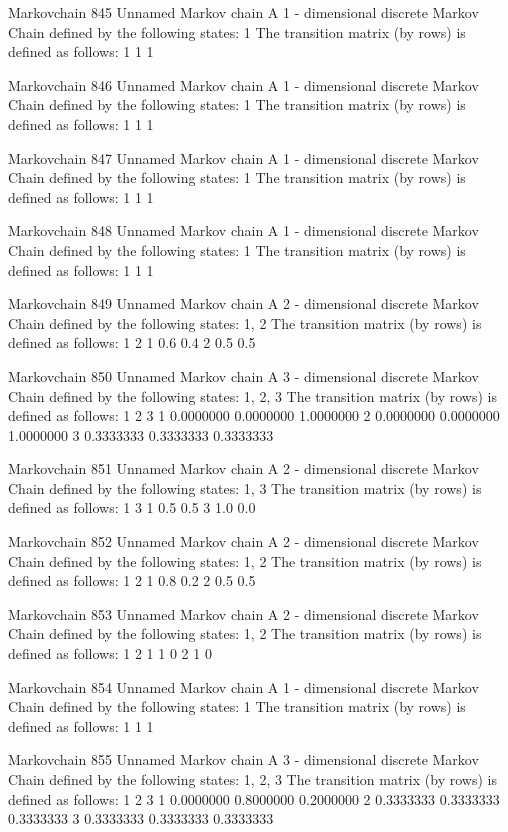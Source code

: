 \documentclass[
  nojss]{jss}
\begin{document}
\begin{CodeChunk}
\begin{CodeOutput}
Markovchain  845 
Unnamed Markov chain 
 A  1 - dimensional discrete Markov Chain defined by the following states: 
 1 
 The transition matrix  (by rows)  is defined as follows: 
  1
1 1

Markovchain  846 
Unnamed Markov chain 
 A  1 - dimensional discrete Markov Chain defined by the following states: 
 1 
 The transition matrix  (by rows)  is defined as follows: 
  1
1 1

Markovchain  847 
Unnamed Markov chain 
 A  1 - dimensional discrete Markov Chain defined by the following states: 
 1 
 The transition matrix  (by rows)  is defined as follows: 
  1
1 1

Markovchain  848 
Unnamed Markov chain 
 A  1 - dimensional discrete Markov Chain defined by the following states: 
 1 
 The transition matrix  (by rows)  is defined as follows: 
  1
1 1

Markovchain  849 
Unnamed Markov chain 
 A  2 - dimensional discrete Markov Chain defined by the following states: 
 1, 2 
 The transition matrix  (by rows)  is defined as follows: 
    1   2
1 0.6 0.4
2 0.5 0.5

Markovchain  850 
Unnamed Markov chain 
 A  3 - dimensional discrete Markov Chain defined by the following states: 
 1, 2, 3 
 The transition matrix  (by rows)  is defined as follows: 
          1         2         3
1 0.0000000 0.0000000 1.0000000
2 0.0000000 0.0000000 1.0000000
3 0.3333333 0.3333333 0.3333333

Markovchain  851 
Unnamed Markov chain 
 A  2 - dimensional discrete Markov Chain defined by the following states: 
 1, 3 
 The transition matrix  (by rows)  is defined as follows: 
    1   3
1 0.5 0.5
3 1.0 0.0

Markovchain  852 
Unnamed Markov chain 
 A  2 - dimensional discrete Markov Chain defined by the following states: 
 1, 2 
 The transition matrix  (by rows)  is defined as follows: 
    1   2
1 0.8 0.2
2 0.5 0.5

Markovchain  853 
Unnamed Markov chain 
 A  2 - dimensional discrete Markov Chain defined by the following states: 
 1, 2 
 The transition matrix  (by rows)  is defined as follows: 
  1 2
1 1 0
2 1 0

Markovchain  854 
Unnamed Markov chain 
 A  1 - dimensional discrete Markov Chain defined by the following states: 
 1 
 The transition matrix  (by rows)  is defined as follows: 
  1
1 1

Markovchain  855 
Unnamed Markov chain 
 A  3 - dimensional discrete Markov Chain defined by the following states: 
 1, 2, 3 
 The transition matrix  (by rows)  is defined as follows: 
          1         2         3
1 0.0000000 0.8000000 0.2000000
2 0.3333333 0.3333333 0.3333333
3 0.3333333 0.3333333 0.3333333


\end{CodeOutput}
\end{CodeChunk}
\end{document}
